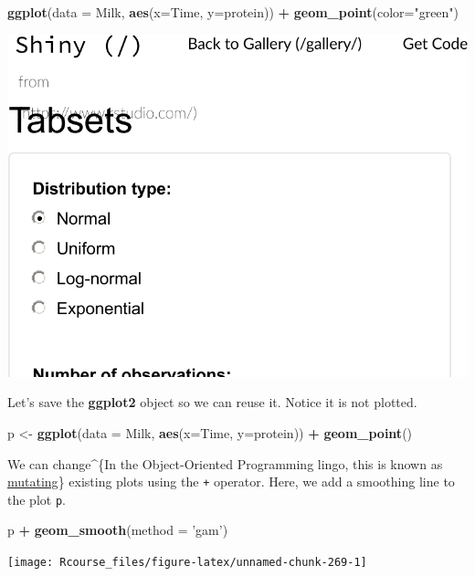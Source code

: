 \documentclass[]{book}
\newenvironment{Shaded}{\begin{snugshade}}{\end{snugshade}}
\newcommand{\KeywordTok}[1]{\textcolor[rgb]{0.13,0.29,0.53}{\textbf{#1}}}
\newcommand{\DataTypeTok}[1]{\textcolor[rgb]{0.13,0.29,0.53}{#1}}
\newcommand{\StringTok}[1]{\textcolor[rgb]{0.31,0.60,0.02}{#1}}
\newcommand{\OperatorTok}[1]{\textcolor[rgb]{0.81,0.36,0.00}{\textbf{#1}}}
\newcommand{\NormalTok}[1]{#1}
\theoremstyle{definition}
\theoremstyle{definition}
\theoremstyle{definition}
\theoremstyle{remark}
\begin{document}
\begin{Shaded}
\begin{Highlighting}[]
\KeywordTok{ggplot}\NormalTok{(}\DataTypeTok{data =}\NormalTok{ Milk, }\KeywordTok{aes}\NormalTok{(}\DataTypeTok{x=}\NormalTok{Time, }\DataTypeTok{y=}\NormalTok{protein)) }\OperatorTok{+}
\StringTok{  }\KeywordTok{geom_point}\NormalTok{(}\DataTypeTok{color=}\StringTok{"green"}\NormalTok{)}
\end{Highlighting}
\end{Shaded}

\includegraphics[width=0.5\linewidth]{Rcourse_files/figure-latex/unnamed-chunk-267-1}

Let's save the \textbf{ggplot2} object so we can reuse it. Notice it is
not plotted.

\begin{Shaded}
\begin{Highlighting}[]
\NormalTok{p <-}\StringTok{ }\KeywordTok{ggplot}\NormalTok{(}\DataTypeTok{data =}\NormalTok{ Milk, }\KeywordTok{aes}\NormalTok{(}\DataTypeTok{x=}\NormalTok{Time, }\DataTypeTok{y=}\NormalTok{protein)) }\OperatorTok{+}
\StringTok{  }\KeywordTok{geom_point}\NormalTok{()}
\end{Highlighting}
\end{Shaded}

We can change\^{}\{In the Object-Oriented Programming lingo, this is
known as
\href{https://en.wikipedia.org/wiki/Immutable_object}{mutating}\}
existing plots using the \texttt{+} operator. Here, we add a smoothing
line to the plot \texttt{p}.

\begin{Shaded}
\begin{Highlighting}[]
\NormalTok{p }\OperatorTok{+}\StringTok{ }\KeywordTok{geom_smooth}\NormalTok{(}\DataTypeTok{method =} \StringTok{'gam'}\NormalTok{)}
\end{Highlighting}
\end{Shaded}

\texttt{[image: Rcourse\_files/figure-latex/unnamed-chunk-269-1]}
\end{document}
